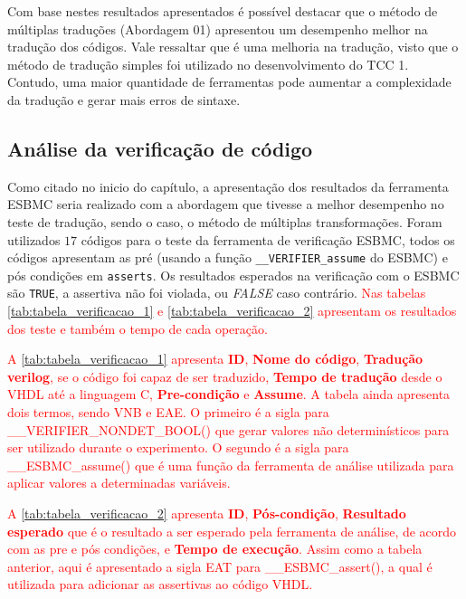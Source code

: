 Com base nestes resultados apresentados é possível destacar que o método de múltiplas traduções (Abordagem 01) apresentou um desempenho melhor na tradução dos códigos. Vale ressaltar que é uma melhoria na tradução, visto que o método de tradução simples foi utilizado no desenvolvimento do TCC 1. Contudo, uma maior quantidade de ferramentas pode aumentar a complexidade da tradução e gerar mais erros de sintaxe.

\subsection{Análise da verificação de código}
Como citado no inicio do capítulo, a apresentação dos resultados da ferramenta ESBMC seria realizado com a abordagem que tivesse a melhor desempenho no teste de tradução, sendo o caso, o método de múltiplas transformações. Foram utilizados $17$ códigos para o teste da ferramenta de verificação ESBMC, todos os códigos apresentam as pré (usando a função \texttt{\_\_VERIFIER\_assume} do ESBMC) e pós condições  em \texttt{asserts}. 
Os resultados esperados na verificação com o ESBMC são \texttt{TRUE}, a assertiva não foi violada, ou \textit{FALSE} caso contrário. \textcolor{red}{Nas tabelas \autoref{tab:tabela_verificacao_1} e \autoref{tab:tabela_verificacao_2} apresentam os resultados dos teste e também o tempo de cada operação.}

\par
\textcolor{red}{A \autoref{tab:tabela_verificacao_1} apresenta \textbf{ID}, \textbf{Nome do código}, \textbf{Tradução verilog}, se o código foi capaz de ser traduzido, \textbf{Tempo de tradução} desde o VHDL até a linguagem C, \textbf{Pre-condição} e \textbf{Assume}. A tabela ainda apresenta dois termos, sendo VNB e EAE. O primeiro é a sigla para \_\_VERIFIER\_NONDET\_BOOL() que gerar valores não determinísticos para ser utilizado durante o experimento. O segundo é a sigla para \_\_ESBMC\_assume() que é uma função da ferramenta de análise utilizada para aplicar valores a determinadas variáveis.} 

\par
\textcolor{red}{A \autoref{tab:tabela_verificacao_2} apresenta \textbf{ID}, \textbf{Pós-condição}, \textbf{Resultado esperado} que é o resultado a ser esperado pela ferramenta de análise, de acordo com as pre e pós condições, e \textbf{Tempo de execução}. Assim como a tabela anterior, aqui é apresentado a sigla EAT para \_\_ESBMC\_assert(), a qual é utilizada para adicionar as assertivas ao código VHDL.}

